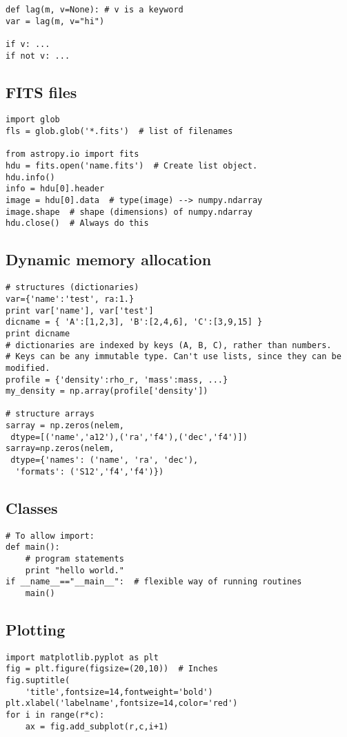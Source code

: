 \documentclass{article}
\begin{document}
\begin{multicols}{2}
\begin{lstlisting}
def lag(m, v=None): # v is a keyword
var = lag(m, v="hi")

if v: ...
if not v: ...
\end{lstlisting}
\columnbreak


\subsection{FITS files}
\begin{lstlisting}
import glob
fls = glob.glob('*.fits')  # list of filenames

from astropy.io import fits
hdu = fits.open('name.fits')  # Create list object.
hdu.info()
info = hdu[0].header
image = hdu[0].data  # type(image) --> numpy.ndarray
image.shape  # shape (dimensions) of numpy.ndarray
hdu.close()  # Always do this
\end{lstlisting}

\subsection{Dynamic memory allocation}
\begin{lstlisting}
# structures (dictionaries)
var={'name':'test', ra:1.}
print var['name'], var['test']
dicname = { 'A':[1,2,3], 'B':[2,4,6], 'C':[3,9,15] }
print dicname
# dictionaries are indexed by keys (A, B, C), rather than numbers.
# Keys can be any immutable type. Can't use lists, since they can be modified.
profile = {'density':rho_r, 'mass':mass, ...}
my_density = np.array(profile['density'])

# structure arrays
sarray = np.zeros(nelem,
 dtype=[('name','a12'),('ra','f4'),('dec','f4')])
sarray=np.zeros(nelem,
 dtype={'names': ('name', 'ra', 'dec'),
  'formats': ('S12','f4','f4')})
\end{lstlisting}

\subsection{Classes}
\begin{lstlisting}
# To allow import:
def main():
    # program statements
    print "hello world."
if __name__=="__main__":  # flexible way of running routines
    main()
\end{lstlisting}

\newpage

\newpage
\subsection{Plotting}
\begin{lstlisting}
import matplotlib.pyplot as plt
fig = plt.figure(figsize=(20,10))  # Inches
fig.suptitle(
    'title',fontsize=14,fontweight='bold')
plt.xlabel('labelname',fontsize=14,color='red')
for i in range(r*c):
    ax = fig.add_subplot(r,c,i+1)


\end{lstlisting}
\end{multicols}
\end{document}
